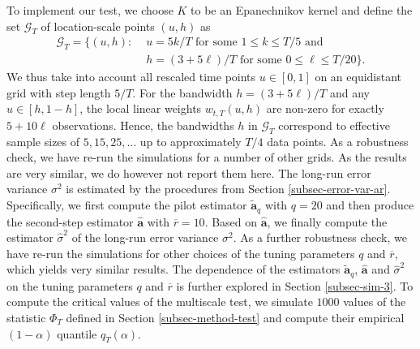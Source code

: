 To implement our test, we choose $K$ to be an Epanechnikov kernel and define the set $\mathcal{G}_T$ of location-scale points $(u,h)$ as
\begin{align}
\mathcal{G}_T = \big\{ (u, h): & \, \, u = 5k/T \text{ for some } 1 \le k \le T/5 \text{ and } \nonumber \\ & \, \, h = (3+5\ell)/T \text{ for some } 0 \le \ell \le T/20 \big\}. \label{grid-sim-app}
\end{align}
We thus take into account all rescaled time points $u \in [0,1]$ on an equidistant grid with step length $5/T$. For the bandwidth $h = (3 + 5\ell)/T$ and any $u \in [h,1-h]$, the local linear weights $w_{t,T}(u,h)$ are non-zero for exactly $5 + 10 \ell$ observations. Hence, the bandwidths $h$ in $\mathcal{G}_T$ correspond to effective sample sizes of $5, 15, 25, \ldots$ up to approximately $T/4$ data points. As a robustness check, we have re-run the simulations for a number of other grids. As the results are very similar, we do however not report them here. The long-run error variance $\sigma^2$ is estimated by the procedures from Section \ref{subsec-error-var-ar}. Specifically, we first compute the pilot estimator $\widetilde{\boldsymbol{a}}_q$ with $q = 20$ and then produce the second-step estimator $\widehat{\boldsymbol{a}}$ with $\overline{r} = 10$. Based on $\widehat{\boldsymbol{a}}$, we finally compute the estimator $\widehat{\sigma}^2$ of the long-run error variance $\sigma^2$. As a further robustness check, we have re-run the simulations for other choices of the tuning parameters $q$ and $\overline{r}$, which yields very similar results. The dependence of the estimators $\widetilde{\boldsymbol{a}}_q$, $\widehat{\boldsymbol{a}}$ and $\widehat{\sigma}^2$ on the tuning parameters $q$ and $\overline{r}$ is further explored in Section \ref{subsec-sim-3}. To compute the critical values of the multiscale test, we simulate $1000$ values of the statistic $\Phi_T$ defined in Section \ref{subsec-method-test} and compute their empirical $(1-\alpha)$ quantile $q_T(\alpha)$. 


